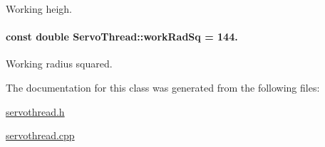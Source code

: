 Working heigh. 

\hypertarget{a00009_a4b9e5de00a02c6f77e4308ed209f0cc0}{}
\paragraph[{work\+Rad\+Sq}]{\setlength{\rightskip}{0pt plus 5cm}const double Servo\+Thread\+::work\+Rad\+Sq = 144.\hspace{0.3cm}{\ttfamily [private]}}\label{a00009_a4b9e5de00a02c6f77e4308ed209f0cc0}


Working radius squared. 



The documentation for this class was generated from the following files\+:\begin{DoxyCompactItemize}
\item 
\hyperlink{a00024}{servothread.\+h}\item 
\hyperlink{a00023}{servothread.\+cpp}\end{DoxyCompactItemize}
